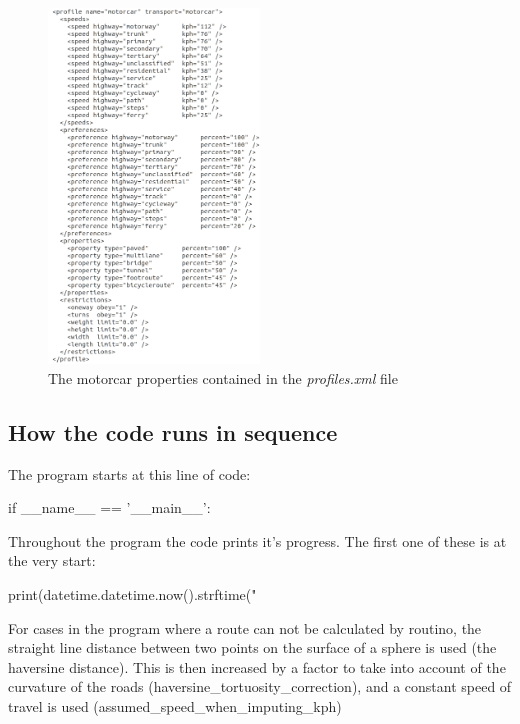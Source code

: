 \documentclass{article}
\begin{document}
\begin{flushleft}
\begin{figure}[!h]
	\centering
	\includegraphics[width=0.5\textwidth]{images/motorcar.png}
	\caption{The motorcar properties contained in the \textit{profiles.xml} file}
	\label{fig:motorcar}
\end{figure}

\newpage

\subsection{How the code runs in sequence}

The program starts at this line of code:\\

\begin{python}
	if __name__ == '__main__':
\end{python}

Throughout the program the code prints it's progress. The first one of these is at the very start:\\

\begin{python}
	print(datetime.datetime.now().strftime("%
\end{python}

For cases in the program where a route can not be calculated by routino, the straight line distance between two points on the surface of a sphere is used (the haversine distance). This is then increased by a factor to take into account of the curvature of the roads (haversine\_tortuosity\_correction), and a constant speed of travel is used (assumed\_speed\_when\_imputing\_kph)\\


\end{flushleft}
\end{document}
